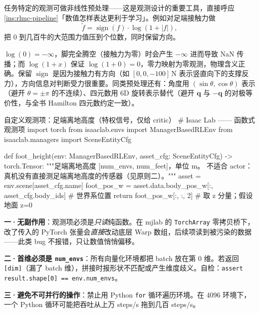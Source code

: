 任务特定的观测可做非线性预处理——这是观测设计的重要工具，直接呼应 \cref{ins:rlmc-pipeline}「数值怎样表达更利于学习」。例如对足端接触力做
\begin{equation}
\tilde f = \operatorname{sign}(f)\cdot\log(1+\lvert f\rvert),
\label{eq:rlmc-log1p}
\end{equation}
把 $0$ 到几百牛的大范围力值压到个位数，同时保留方向。

\begin{insight}\label{ins:rlmc-log1p}
$\log(0)=-\infty$，脚完全腾空（接触力为零）时会产生 $-\infty$ 进而导致 NaN 传播；而 $\log(1+x)$ 保证 $\log(1+0)=0$，零力映射为零观测，物理含义正确。保留 $\operatorname{sign}$ 是因为接触力有方向（如 $[0,0,-100]\,$N 表示竖直向下的支撑反力），方向信息对判断受力很重要。同类预处理还有：角度用 $(\sin\theta,\cos\theta)$ 表示（避开 $\theta=\pm\pi$ 的不连续）、四元数用 6D 旋转表示替代（避开 $\mathbf q$ 与 $-\mathbf q$ 的对极等价性，与全书 Hamilton 四元数约定一致）。
\end{insight}

\begin{codebox}[Python]{自定义观测项：足端离地高度（特权信号，仅给 critic）}
# Isaac Lab —— 函数式观测项
import torch
from isaaclab.envs import ManagerBasedRLEnv
from isaaclab.managers import SceneEntityCfg

def foot_height(env: ManagerBasedRLEnv, asset_cfg: SceneEntityCfg) -> torch.Tensor:
    """足端离地高度 [num_envs, num_feet]，单位 m。
    不适合 actor：真机没有直接测足端离地高度的传感器（见原则二）。"""
    asset = env.scene[asset_cfg.name]
    foot_pos_w = asset.data.body_pos_w[:, asset_cfg.body_ids]  # 世界系位置
    return foot_pos_w[:, :, 2]  # 取 z 分量；假设地面 z=0
\end{codebox}

\begin{pitfall}[编写观测项的三条铁律]
\textbf{一·无副作用}：观测项必须是\emph{只读}纯函数。在 mjlab 的 \verb|TorchArray| 零拷贝桥下，改了传入的 PyTorch 张量会\emph{直接}改动底层 Warp 数组，后续项读到被污染的数据——此类 bug 不报错，只让数值悄悄偏移。

\textbf{二·首维必须是 \texttt{num\_envs}}：所有向量化环境都把 batch 放在第 0 维。若返回 \verb|[dim]|（漏了 batch 维），拼接时报形状不匹配或产生维度歧义。自检：\verb|assert result.shape[0] == env.num_envs|。

\textbf{三·避免不可并行的操作}：禁止用 Python \verb|for| 循环遍历环境。在 4096 环境下，一个 Python 循环可能把吞吐从上万 steps/s 拖到几百 steps/s。
\end{pitfall}

